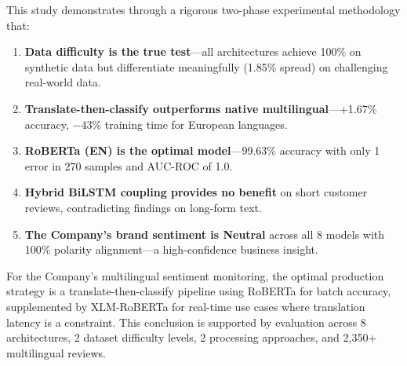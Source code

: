 \documentclass[10pt,twocolumn,a4paper]{article}
\begin{document}
This study demonstrates through a rigorous two-phase experimental methodology that:

\begin{enumerate}[leftmargin=*,noitemsep,topsep=2pt]
    \item \textbf{Data difficulty is the true test}---all architectures achieve 100\% on synthetic data but differentiate meaningfully (1.85\% spread) on challenging real-world data.
    \item \textbf{Translate-then-classify outperforms native multilingual}---+1.67\% accuracy, $-$43\% training time for European languages.
    \item \textbf{RoBERTa (EN) is the optimal model}---99.63\% accuracy with only 1 error in 270 samples and AUC-ROC of 1.0.
    \item \textbf{Hybrid BiLSTM coupling provides no benefit} on short customer reviews, contradicting findings on long-form text.
    \item \textbf{The Company's brand sentiment is Neutral} across all 8 models with 100\% polarity alignment---a high-confidence business insight.
\end{enumerate}

For the Company's multilingual sentiment monitoring, the optimal production strategy is a translate-then-classify pipeline using RoBERTa for batch accuracy, supplemented by XLM-RoBERTa for real-time use cases where translation latency is a constraint. This conclusion is supported by evaluation across 8 architectures, 2 dataset difficulty levels, 2 processing approaches, and 2,350+ multilingual reviews.


\end{document}
